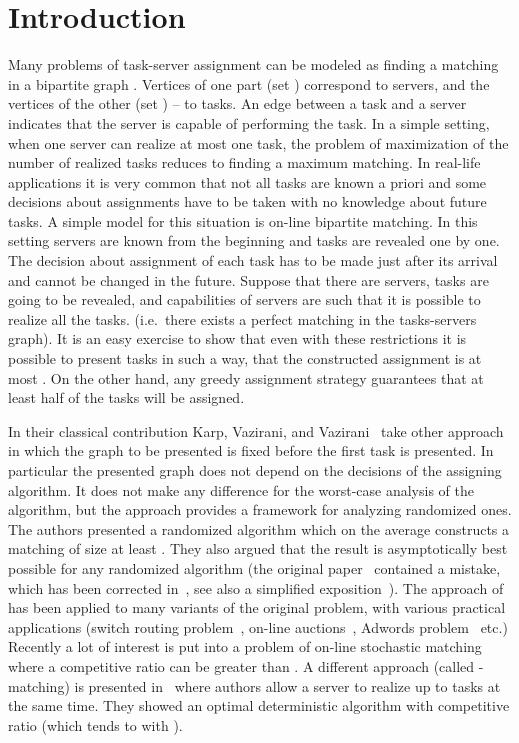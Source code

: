 \documentclass[12pt]{amsart}
\theoremstyle{definition}
\begin{document}
\section{Introduction}
Many problems of task-server assignment can be modeled as finding a matching in a bipartite graph . 
Vertices of one part (set ) correspond to servers, and the vertices of the other (set ) -- to tasks. 
An edge between a task and a server indicates that the server is capable of performing the task. 
In a simple  setting, when one server can realize at most one task, the problem of maximization of the number of realized tasks reduces to finding a maximum matching.
In real-life applications it is very common that not all tasks are known a priori and some decisions about assignments have to be taken with no knowledge about future tasks. 
A simple model for this situation is on-line bipartite matching. 
In this setting servers are known from the beginning and tasks are revealed one by one. 
The decision about assignment of each task has to be made just after its arrival and cannot be changed in the future.   
Suppose that there are  servers,  tasks are going to be revealed, and capabilities of servers are such that it is possible to realize all the tasks.
(i.e.\ there exists a perfect matching in the tasks-servers graph). 
It is an easy exercise to show that even with these restrictions it is possible to present tasks in such a way, that the constructed assignment is at most . 
On the other hand, any greedy assignment strategy guarantees that at least half of the tasks will be assigned. 

In their classical contribution Karp, Vazirani, and Vazirani~\cite{KVV90} take other approach in which the graph to be presented is fixed before the first task is presented. 
In particular the presented graph does not depend on the decisions of the assigning algorithm. 
It does not make any difference for the worst-case analysis of the algorithm, but the approach provides a framework for analyzing randomized ones. 
The authors presented a randomized algorithm which on the average constructs a matching of size at least . 
They also argued that the result is asymptotically best possible for any randomized algorithm (the original paper~\cite{KVV90} contained a mistake, which has been corrected in~\cite{GM2008}, see also a simplified exposition~\cite{BM2008}). 
The approach of~\cite{KVV90} has been applied to many variants of the original problem, with various practical applications (switch routing problem~\cite{AC2006, AR2003}, on-line auctions~\cite{MGS2011}, Adwords problem~\cite{DH2009, GM2008, MSV2007} etc.) 
Recently a lot of interest is put into a problem of on-line stochastic matching~\cite{BK2010, FMMM2009, KMT2011, MGS2011, MP2012} where a competitive ratio can be  greater than .
A different approach (called -matching) is presented in~\cite{KalKir2000} where authors allow a server to realize up to  tasks at the same time. 
They showed an optimal deterministic algorithm with  competitive ratio  (which tends to  with ).
\end{document}
